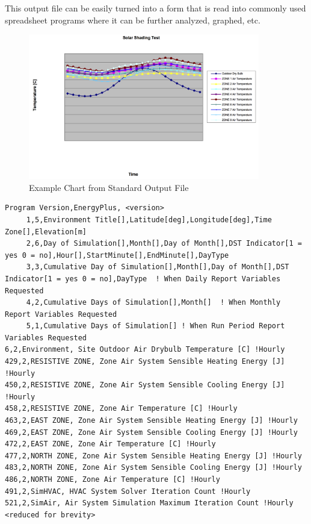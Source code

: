 This output file can be easily turned into a form that is read into commonly used spreadsheet programs where it can be further analyzed, graphed, etc.

\begin{figure}[hbtp] %
\centering
\includegraphics[width=0.9\textwidth, height=0.9\textheight, keepaspectratio=true]{media/image014.png}
\caption{Example Chart from Standard Output File \label{fig:example-chart-from-standard-output-file}}
\end{figure}

\begin{lstlisting}
Program Version,EnergyPlus, <version>
     1,5,Environment Title[],Latitude[deg],Longitude[deg],Time Zone[],Elevation[m]
     2,6,Day of Simulation[],Month[],Day of Month[],DST Indicator[1 = yes 0 = no],Hour[],StartMinute[],EndMinute[],DayType
     3,3,Cumulative Day of Simulation[],Month[],Day of Month[],DST Indicator[1 = yes 0 = no],DayType  ! When Daily Report Variables Requested
     4,2,Cumulative Days of Simulation[],Month[]  ! When Monthly Report Variables Requested
     5,1,Cumulative Days of Simulation[] ! When Run Period Report Variables Requested
6,2,Environment, Site Outdoor Air Drybulb Temperature [C] !Hourly
429,2,RESISTIVE ZONE, Zone Air System Sensible Heating Energy [J] !Hourly
450,2,RESISTIVE ZONE, Zone Air System Sensible Cooling Energy [J] !Hourly
458,2,RESISTIVE ZONE, Zone Air Temperature [C] !Hourly
463,2,EAST ZONE, Zone Air System Sensible Heating Energy [J] !Hourly
469,2,EAST ZONE, Zone Air System Sensible Cooling Energy [J] !Hourly
472,2,EAST ZONE, Zone Air Temperature [C] !Hourly
477,2,NORTH ZONE, Zone Air System Sensible Heating Energy [J] !Hourly
483,2,NORTH ZONE, Zone Air System Sensible Cooling Energy [J] !Hourly
486,2,NORTH ZONE, Zone Air Temperature [C] !Hourly
491,2,SimHVAC, HVAC System Solver Iteration Count !Hourly
521,2,SimAir, Air System Simulation Maximum Iteration Count !Hourly
<reduced for brevity>
\end{lstlisting}

